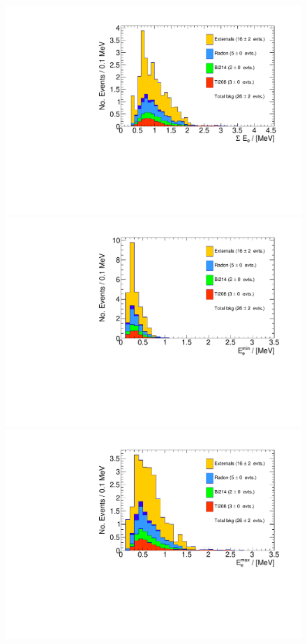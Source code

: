 \documentclass[main.tex]{subfiles}
\begin{document}
\begin{figure}[h!]
\centering
\includegraphics[scale=0.37]{pictures/FinalResults/bb2nu2/150/preselection/preSelection2e2gBKG_tot_e_energy.pdf}
\includegraphics[scale=0.37]{pictures/FinalResults/bb2nu2/150/preselection/preSelection2e2gBKG_min_e_energy.pdf}
\includegraphics[scale=0.37]{pictures/FinalResults/bb2nu2/150/preselection/preSelection2e2gBKG_max_e_energy.pdf}

\end{figure}
\end{document}
